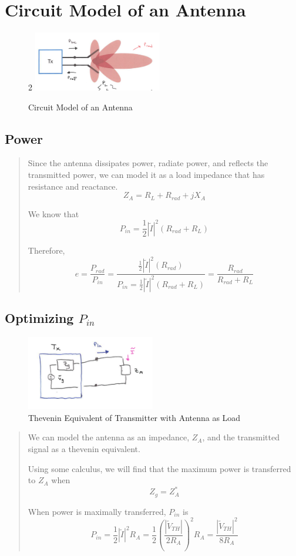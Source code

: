 \documentclass{article} %
\begin{document}
\section{Circuit Model of an Antenna}
\begin{figure}[H]2
    \centering
    \includegraphics[width=0.5\textwidth]{./image/figure9.png}
    \caption{Circuit Model of an Antenna}
\end{figure}
\subsection{Power}
\begin{quote}
    Since the antenna dissipates power, radiate power, and reflects the transmitted power, we can model it as a load impedance that has resistance and reactance.
    \[Z_A = R_L + R_{rad} + j X_A\]

    We know that
    \[P_{in} = \frac{1}{2}|\tilde{I}|^2 (R_{rad} + R_L)\]

    Therefore,
    \[e = \frac{P_{rad}}{P_{in}} = \frac{\frac{1}{2}|\tilde{I}|^2 (R_{rad})}{P_{in} = \frac{1}{2}|\tilde{I}|^2 (R_{rad} + R_L)} = \frac{R_{rad}}{R_{rad} + R_L}\]
\end{quote}

\subsection{Optimizing $P_{in}$}

\begin{figure}[H]
    \centering
    \includegraphics[width=0.5\textwidth]{./image/figure5.png}
    \caption{Thevenin Equivalent of Transmitter with Antenna as Load}
\end{figure}
\begin{quote}
    We can model the antenna as an impedance, $Z_A$, and the transmitted signal as a thevenin equivalent.

    Using some calculus, we will find that the maximum power is transferred to $Z_A$ when
    \[Z_g = Z_A^*\]

    When power is maximally transferred, $P_{in}$ is
    \[P_{in} = \frac{1}{2}|\tilde{I}|^2 R_A = \frac{1}{2}\left(\frac{|\tilde{V}_{TH}|}{2R_A}\right)^2R_A = \frac{|\tilde{V}_{TH}|^2}{8R_A}\]
\end{quote}
\end{document}
